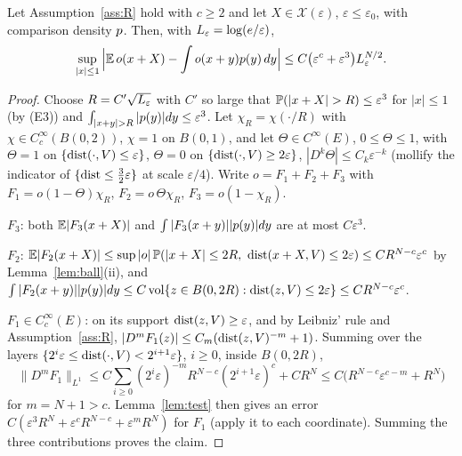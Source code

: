 \begin{proposition}\label{prop:field}
Let Assumption~\ref{ass:R} hold with $c\ge2$ and let $X\in\mathcal X(\varepsilon)$, $\varepsilon\le\varepsilon_0$, with
comparison density $p$. Then, with $L_\varepsilon=\log(e/\varepsilon)$,
\[
\sup_{|x|\le1}\Big|\mathbb{E}\,o(x+X)-\int o(x+y)p(y)\,dy\Big|\le C\big(\varepsilon^{c}+\varepsilon^3\big)L_\varepsilon^{N/2}.
\]
\end{proposition}
\begin{proof}
Choose $R=C'\sqrt{L_\varepsilon}$ with $C'$ so large that $\Prob(|x+X|>R)\le\varepsilon^3$ for $|x|\le1$ (by \textup{(E3)}) and
$\int_{|x+y|>R}|\psie(y)|dy\le\varepsilon^3$. Let $\chi_R=\chi(\cdot/R)$ with $\chi\in C_c^\infty(B(0,2))$, $\chi=1$ on
$B(0,1)$, and let $\Theta\in C^\infty(E)$, $0\le\Theta\le1$, with $\Theta=1$ on $\{\operatorname{dist}(\cdot,V)\le\varepsilon\}$,
$\Theta=0$ on $\{\operatorname{dist}(\cdot,V)\ge2\varepsilon\}$, $|D^k\Theta|\le C_k\varepsilon^{-k}$ (mollify the indicator of
$\{\operatorname{dist}\le\frac32\varepsilon\}$ at scale $\varepsilon/4$). Write $o=F_1+F_2+F_3$ with $F_1=o(1-\Theta)\chi_R$,
$F_2=o\,\Theta\chi_R$, $F_3=o(1-\chi_R)$.

$F_3$: both $\mathbb{E}|F_3(x+X)|$ and $\int|F_3(x+y)||p(y)|dy$ are at most $C\varepsilon^3$.

$F_2$: $\E|F_2(x+X)|\le\sup|o|\,\Prob(|x+X|\le2R,\ \dist(x+X,V)\le2\varepsilon)\le CR^{N-c}\varepsilon^c$ by
Lemma~\ref{lem:ball}(ii), and $\int|F_2(x+y)||p(y)|dy\le C\operatorname{vol}\{z\in B(0,2R):\operatorname{dist}(z,V)\le2\varepsilon\}\le CR^{N-c}\varepsilon^c$.

$F_1\in C_c^\infty(E)$: on its support $\operatorname{dist}(z,V)\ge\varepsilon$, and by Leibniz' rule and Assumption~\ref{ass:R},
$|D^mF_1(z)|\le C_m(\operatorname{dist}(z,V)^{-m}+1)$. Summing over the layers $\{2^i\varepsilon\le\operatorname{dist}(\cdot,V)<2^{i+1}\varepsilon\}$,
$i\ge0$, inside $B(0,2R)$,
\[
\|D^mF_1\|_{L^1}\le C\sum_{i\ge0}(2^i\varepsilon)^{-m}R^{N-c}(2^{i+1}\varepsilon)^c+CR^N\le C\big(R^{N-c}\varepsilon^{c-m}+R^N\big)
\]
for $m=N+1>c$.
Lemma~\ref{lem:test} then gives an error $C(\varepsilon^3R^N+\varepsilon^cR^{N-c}+\varepsilon^mR^N)$ for $F_1$ (apply it to
each coordinate). Summing the three contributions proves the claim.
\end{proof}

